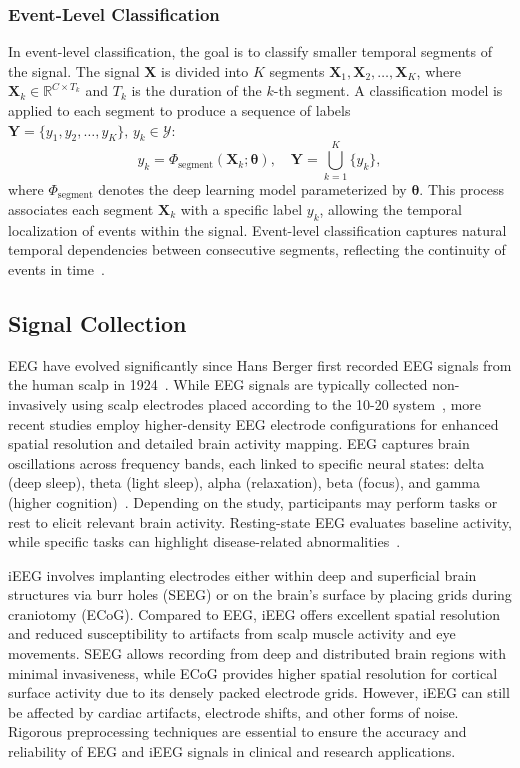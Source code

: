 \subsubsection{Event-Level Classification}
In event-level classification, the goal is to classify smaller temporal segments of the signal. The signal $\mathbf{X}$ is divided into $K$ segments $\mathbf{X}_1, \mathbf{X}_2, \dots, \mathbf{X}_K$, where $\mathbf{X}_k \in \mathbb{R}^{C \times T_k}$ and $T_k$ is the duration of the $k$-th segment. A classification model is applied to each segment to produce a sequence of labels $\mathbf{Y} = \{y_1, y_2, \dots, y_K\}, \, y_k \in \mathcal{Y}$:
\[
y_k = \Phi_{\text{segment}}(\mathbf{X}_k; \boldsymbol{\theta}), \quad \mathbf{Y} = \bigcup_{k=1}^K \{y_k\},
\]
where $\Phi_{\text{segment}}$ denotes the deep learning model parameterized by $\boldsymbol{\theta}$. This process associates each segment $\mathbf{X}_k$ with a specific label $y_k$, allowing the temporal localization of events within the signal.
Event-level classification captures natural temporal dependencies between consecutive segments, reflecting the continuity of events in time~\cite{chen2024con4m}.

\subsection{Signal Collection}
EEG have evolved significantly since Hans Berger first recorded EEG signals from the human scalp in 1924~\cite{berger1929elektroenkephalogramm}.
While EEG signals are typically collected non-invasively using scalp electrodes placed according to the 10-20 system~\cite{jasper1958ten},
more recent studies employ higher-density EEG electrode configurations for enhanced spatial resolution and detailed brain activity mapping.
EEG captures brain oscillations across frequency bands, each linked to specific neural states: delta (deep sleep), theta (light sleep), alpha (relaxation), beta (focus), and gamma (higher cognition)~\cite{buzsaki2004neuronal}.
Depending on the study, participants may perform tasks or rest to elicit relevant brain activity. Resting-state EEG evaluates baseline activity, while specific tasks can highlight disease-related abnormalities~\cite{jeong2004eeg}.

iEEG involves implanting electrodes either within deep and superficial brain structures via burr holes (SEEG) or on the brain’s surface by placing grids during craniotomy (ECoG).
Compared to EEG, iEEG offers excellent spatial resolution and reduced susceptibility to artifacts from scalp muscle activity and eye movements.
SEEG allows recording from deep and distributed brain regions with minimal invasiveness, while ECoG provides higher spatial resolution for cortical surface activity due to its densely packed electrode grids. 
However, iEEG can still be affected by cardiac artifacts, electrode shifts, and other forms of noise. Rigorous preprocessing techniques are essential to ensure the accuracy and reliability of EEG and iEEG signals in clinical and research applications.

